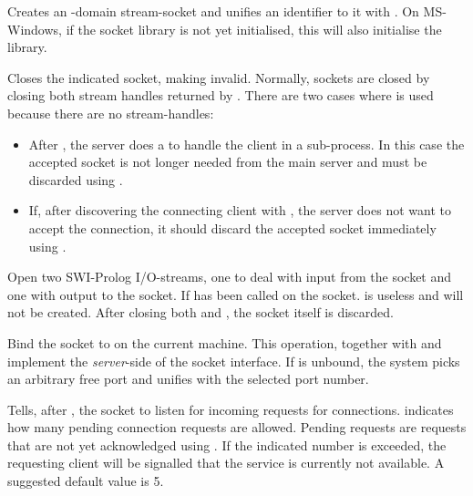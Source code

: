\documentclass[11pt]{article}
\begin{document}
\begin{description}
Creates an -domain stream-socket and unifies an identifier
to it with . On MS-Windows, if the socket library is not
yet initialised, this will also initialise the library.

Closes the indicated socket, making  invalid.  Normally,
sockets are closed by closing both stream handles returned by
.  There are two cases where  is used
because there are no stream-handles:

\begin{itemize}
    \item After , the server does a  to handle the client
	  in a sub-process. In this case the accepted socket is not
	  longer needed from the main server and must be discarded
	  using .
    \item If, after discovering the connecting client with ,
          the server does not want to accept the connection, it should
	  discard the accepted socket immediately using .
\end{itemize}

Open two SWI-Prolog I/O-streams, one to deal with input from the socket
and one with output to the socket.  If  has been called on the
socket.  is useless and will not be created. After closing
both  and , the socket itself is discarded.

Bind the socket to  on the current machine.  This operation,
together with  and  implement the {\em server}-side of
the socket interface.  If  is unbound, the system picks an
arbitrary free port and unifies  with the selected port
number.

Tells, after , the socket to listen for incoming requests for
connections.   indicates how many pending connection
requests are allowed.  Pending requests are requests that are not yet
acknowledged using .  If the indicated number is exceeded, the
requesting client will be signalled that the service is currently not
available.  A suggested default value is 5.


\end{description}
\end{document}
